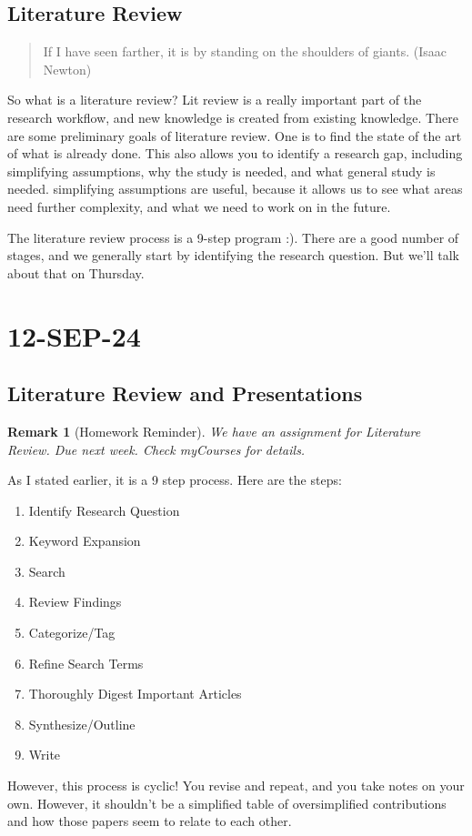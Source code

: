\documentclass[10pt, oneside]{article}
\newtheorem{rem}{Remark}
\begin{document}
\subsection{Literature Review}
\begin{quote}
    If I have seen farther, it is by standing on the shoulders of giants. (Isaac Newton)
\end{quote}
So what is a literature review? Lit review is a really important part of the research workflow, and new knowledge is created from existing knowledge.
There are some preliminary goals of literature review. One is to find the state of the art of what is already done. This also allows you to identify a research gap, including simplifying assumptions, why the study is needed, and what general study is needed. simplifying assumptions are useful, because it allows us to see what areas need further complexity, and what we need to work on in the future. 

The literature review process is a 9-step program :). There are a good number of stages, and we generally start by identifying the research question. But we'll talk about that on Thursday. 
\section{12-SEP-24}
\subsection{Literature Review and Presentations}
\begin{rem}[Homework Reminder]
    We have an assignment for Literature Review. Due next week. Check myCourses for details. 
\end{rem}

As I stated earlier, it is a 9 step process. Here are the steps:
\begin{enumerate}
    \item Identify Research Question
    \item Keyword Expansion
    \item Search 
    \item Review Findings
    \item Categorize/Tag 
    \item Refine Search Terms 
    \item Thoroughly Digest Important Articles 
    \item Synthesize/Outline 
    \item Write
\end{enumerate}
However, this process is cyclic! You revise and repeat, and you take notes on your own. However, it shouldn't be a simplified table of oversimplified contributions and how those papers seem to relate to each other. 
\end{document}
